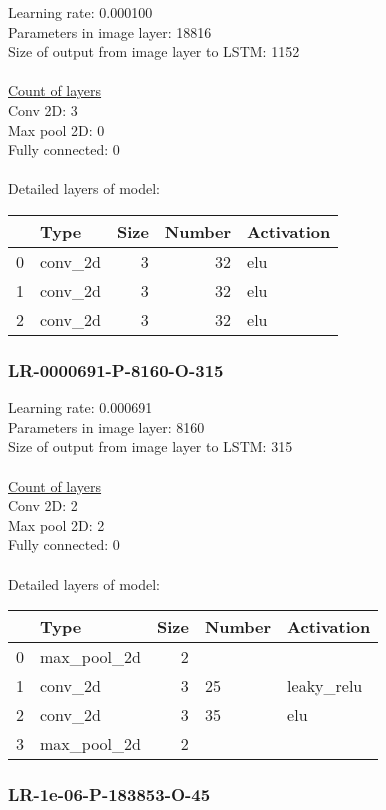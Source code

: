 Learning rate: 0.000100
\\Parameters in image layer: 18816
\\Size of output from image layer to LSTM: 1152
\\\\\underline{Count of layers} 
\\Conv 2D:           3\\Max pool 2D:      0\\Fully connected:  0
\\\\Detailed layers of model: \\\begin{tabular}{rlrrl}
\hline
    & Type    &   Size &   Number & Activation   \\
\hline
  0 & conv\_2d &      3 &       32 & elu          \\
  1 & conv\_2d &      3 &       32 & elu          \\
  2 & conv\_2d &      3 &       32 & elu          \\
\hline
\end{tabular}\subsubsection*{LR-0000691-P-8160-O-315}
Learning rate: 0.000691
\\Parameters in image layer: 8160
\\Size of output from image layer to LSTM: 315
\\\\\underline{Count of layers} 
\\Conv 2D:           2\\Max pool 2D:      2\\Fully connected:  0
\\\\Detailed layers of model: \\\begin{tabular}{rlrll}
\hline
    & Type        &   Size & Number   & Activation   \\
\hline
  0 & max\_pool\_2d &      2 &          &              \\
  1 & conv\_2d     &      3 & 25       & leaky\_relu   \\
  2 & conv\_2d     &      3 & 35       & elu          \\
  3 & max\_pool\_2d &      2 &          &              \\
\hline
\end{tabular}\subsubsection*{LR-1e-06-P-183853-O-45}
